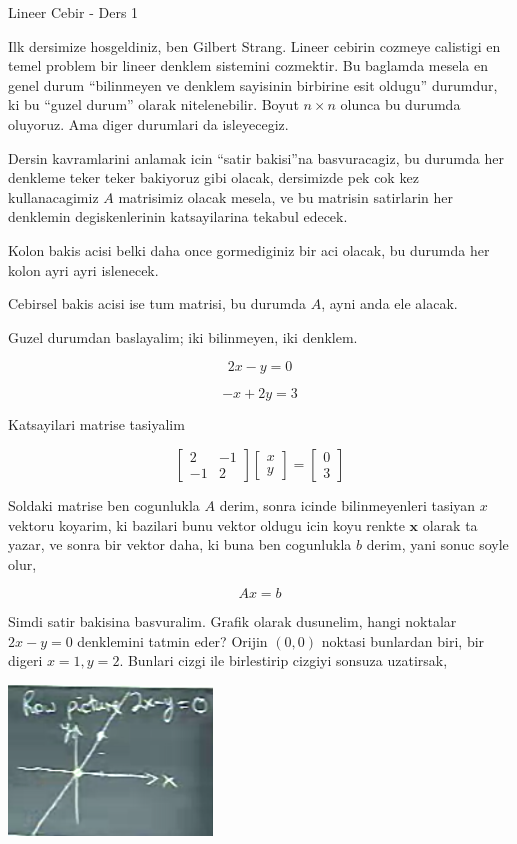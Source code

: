 \documentclass[12pt,fleqn]{article}\usepackage{../common}
\begin{document}
Lineer Cebir - Ders 1

Ilk dersimize hosgeldiniz, ben Gilbert Strang. Lineer cebirin cozmeye
calistigi en temel problem bir lineer denklem sistemini cozmektir. Bu
baglamda mesela en genel durum ``bilinmeyen ve denklem sayisinin birbirine
esit oldugu'' durumdur, ki bu ``guzel durum'' olarak nitelenebilir. Boyut
$n \times n$ olunca bu durumda oluyoruz. Ama diger durumlari da
isleyecegiz. 

Dersin kavramlarini anlamak icin  ``satir bakisi''na basvuracagiz, bu
durumda her denkleme teker teker bakiyoruz gibi olacak, dersimizde pek cok
kez kullanacagimiz $A$ matrisimiz olacak mesela, ve bu matrisin satirlarin
her denklemin degiskenlerinin katsayilarina tekabul edecek.

Kolon bakis acisi belki daha once gormediginiz bir aci olacak, bu durumda
her kolon ayri ayri islenecek. 

Cebirsel bakis acisi ise tum matrisi, bu durumda $A$, ayni anda ele alacak.

Guzel durumdan baslayalim; iki bilinmeyen, iki denklem.

$$ 2x - y = 0 $$

$$ -x + 2y = 3 $$

Katsayilari matrise tasiyalim

$$ 
\left[\begin{array}{cc}
2 & -1 \\
-1 & 2
\end{array}\right]
\left[\begin{array}{c}
x \\
y
\end{array}\right]
=
\left[\begin{array}{c}
0 \\
3
\end{array}\right]
 $$

Soldaki matrise ben cogunlukla $A$ derim, sonra icinde bilinmeyenleri
tasiyan $x$ vektoru koyarim, ki bazilari bunu vektor oldugu icin koyu
renkte $\mathbf{x}$ olarak ta yazar, ve sonra bir vektor daha, ki buna ben
cogunlukla $b$ derim, yani sonuc soyle olur,

$$ A x = b $$

Simdi satir bakisina basvuralim. Grafik olarak dusunelim, hangi noktalar
$2x - y = 0$ denklemini tatmin eder? Orijin $(0,0)$ noktasi bunlardan biri,
bir digeri $x=1,y=2$. Bunlari cizgi ile birlestirip cizgiyi sonsuza uzatirsak,

\includegraphics[height=4cm]{1_01.png}
\end{document}
